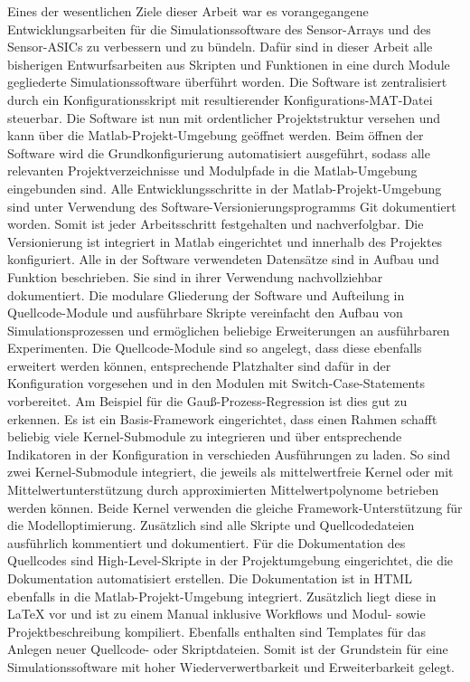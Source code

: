 Eines der wesentlichen Ziele dieser Arbeit war es vorangegangene Entwicklungsarbeiten für die Simulationssoftware des Sensor-Arrays und des Sensor-ASICs zu verbessern und zu bündeln. Dafür sind in dieser Arbeit alle bisherigen Entwurfsarbeiten aus Skripten und Funktionen in eine durch Module gegliederte Simulationssoftware überführt worden. Die Software ist zentralisiert durch ein Konfigurationsskript mit resultierender Konfigurations-MAT-Datei steuerbar. Die Software ist nun mit ordentlicher Projektstruktur versehen und kann über die Matlab-Projekt-Umgebung geöffnet werden. Beim öffnen der Software wird die Grundkonfigurierung automatisiert ausgeführt, sodass alle relevanten Projektverzeichnisse und Modulpfade in die Matlab-Umgebung eingebunden sind. Alle Entwicklungsschritte in der Matlab-Projekt-Umgebung sind unter Verwendung des Software-Versionierungsprogramms Git dokumentiert worden. Somit ist jeder Arbeitsschritt festgehalten und nachverfolgbar. Die Versionierung ist integriert in Matlab eingerichtet und innerhalb des Projektes konfiguriert. Alle in der Software verwendeten Datensätze sind in Aufbau und Funktion beschrieben. Sie sind in ihrer Verwendung nachvollziehbar dokumentiert. Die modulare Gliederung der Software und Aufteilung in Quellcode-Module und ausführbare Skripte vereinfacht den Aufbau von Simulationsprozessen und ermöglichen beliebige Erweiterungen an ausführbaren Experimenten. Die Quellcode-Module sind so angelegt, dass diese ebenfalls erweitert werden können, entsprechende Platzhalter sind dafür in der Konfiguration vorgesehen und in den Modulen mit Switch-Case-Statements vorbereitet. Am Beispiel für die Gauß-Prozess-Regression ist dies gut zu erkennen. Es ist ein Basis-Framework eingerichtet, dass einen Rahmen schafft beliebig viele Kernel-Submodule zu integrieren und über entsprechende Indikatoren in der Konfiguration in verschieden Ausführungen zu laden. So sind zwei Kernel-Submodule integriert, die jeweils als mittelwertfreie Kernel oder mit Mittelwertunterstützung durch approximierten Mittelwertpolynome betrieben werden können. Beide Kernel verwenden die gleiche Framework-Unterstützung für die Modelloptimierung. Zusätzlich sind alle Skripte und Quellcodedateien ausführlich kommentiert und dokumentiert. Für die Dokumentation des Quellcodes sind High-Level-Skripte in der Projektumgebung eingerichtet, die die Dokumentation automatisiert erstellen. Die Dokumentation ist in HTML ebenfalls in die Matlab-Projekt-Umgebung integriert. Zusätzlich liegt diese in LaTeX vor und ist zu einem Manual inklusive Workflows und Modul- sowie Projektbeschreibung kompiliert. Ebenfalls enthalten sind Templates für das Anlegen neuer Quellcode- oder Skriptdateien. Somit ist der Grundstein für eine Simulationssoftware mit hoher Wiederverwertbarkeit und Erweiterbarkeit gelegt.
